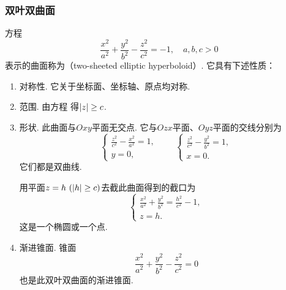 \subsubsection{双叶双曲面}
方程\begin{equation}\label{equation:解析几何.双叶双曲面}
	\frac{x^2}{a^2}+\frac{y^2}{b^2}-\frac{z^2}{c^2}=-1,
	\quad a,b,c>0
\end{equation}
表示的曲面称为（two-sheeted elliptic hyperboloid）.
它具有下述性质：
\begin{enumerate}
	\item 对称性.
	它关于坐标面、坐标轴、原点均对称.

	\item 范围.
	由方程  得\(\abs{z} \geq c\).

	\item 形状.
	此曲面与\(Oxy\)平面无交点.
	它与\(Ozx\)平面、\(Oyz\)平面的交线分别为\[
		\left\{ \begin{array}{l}
			\frac{z^2}{c^2}-\frac{x^2}{a^2}=1, \\
			y = 0,
		\end{array} \right.
		\qquad
		\left\{ \begin{array}{l}
			\frac{z^2}{c^2}-\frac{y^2}{b^2}=1, \\
			x = 0.
		\end{array} \right.
	\]
	它们都是双曲线.

	用平面\(z=h\ (\abs{h}\geq c)\)去截此曲面得到的截口为\[
		\left\{ \begin{array}{l}
			\frac{x^2}{a^2}+\frac{y^2}{b^2}=\frac{h^2}{c^2}-1, \\
			z = h.
		\end{array} \right.
	\]
	这是一个椭圆或一个点.

	\item 渐进锥面.
	锥面\[
		\frac{x^2}{a^2}+\frac{y^2}{b^2}-\frac{z^2}{c^2}=0
	\]也是此双叶双曲面的渐进锥面.
\end{enumerate}

